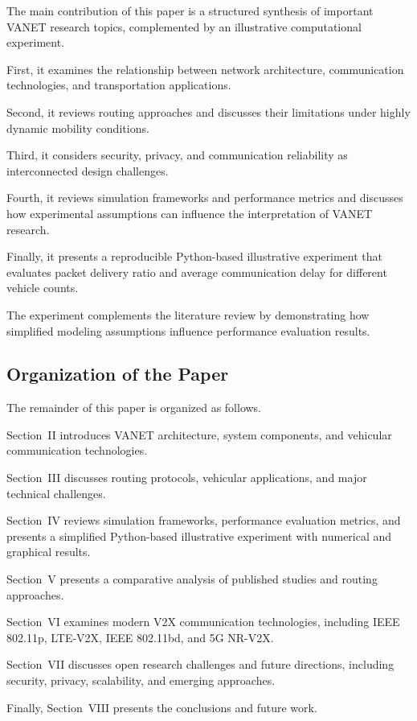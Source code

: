 The main contribution of
this paper is a structured
synthesis of important VANET
research topics, complemented
by an illustrative computational
experiment.

First, it examines
the relationship
between network
architecture,
communication
technologies,
and transportation
applications.

Second, it reviews
routing approaches
and discusses their
limitations under
highly dynamic
mobility conditions.

Third, it considers
security, privacy,
and communication
reliability as
interconnected
design challenges.

Fourth, it reviews
simulation frameworks
and performance metrics
and discusses how
experimental assumptions
can influence the
interpretation of
VANET research.

Finally, it presents a
reproducible Python-based
illustrative experiment
that evaluates packet
delivery ratio and
average communication
delay for different
vehicle counts.

The experiment complements
the literature review by
demonstrating how simplified
modeling assumptions influence
performance evaluation results.

\subsection{Organization of the Paper}

The remainder of this paper is organized
as follows.

Section~II introduces VANET architecture,
system components, and vehicular
communication technologies.

Section~III discusses routing protocols,
vehicular applications, and major
technical challenges.

Section~IV reviews simulation frameworks,
performance evaluation metrics, and
presents a simplified Python-based
illustrative experiment with numerical
and graphical results.

Section~V presents a comparative analysis
of published studies and routing approaches.

Section~VI examines modern V2X communication
technologies, including IEEE 802.11p,
LTE-V2X, IEEE 802.11bd, and 5G NR-V2X.

Section~VII discusses open research
challenges and future directions,
including security, privacy,
scalability, and emerging approaches.

Finally, Section~VIII presents the
conclusions and future work.
